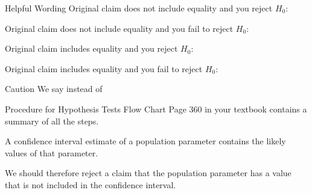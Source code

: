 \documentclass{beamer}
\begin{document}
\begin{frame}
\begin{block}{Helpful Wording}
Original claim does not include equality and you reject $H_0$:
\begin{center}\small
{}
\end{center}\pause

Original claim does not include equality and you fail to reject $H_0$:
\begin{center}\small
{}
\end{center}\pause

Original claim includes equality and you reject $H_0$:
\begin{center}\small
{}
\end{center}\pause

Original claim includes equality and you fail to reject $H_0$:
\begin{center}\small
{}
\end{center}
\end{block}\pause

\begin{block}{Caution}
We say  instead of 
\end{block}
\end{frame}

\begin{frame}
\begin{block}{Procedure for Hypothesis Tests Flow Chart}
Page 360 in your textbook contains a summary of all the steps.
\end{block}\pause

\begin{note}
A confidence interval estimate of a population parameter contains the likely values of that parameter. 

\vspace{2mm}
We should therefore reject a claim that the population parameter has a value that is not included in the confidence interval.
\end{note}
\end{frame}
\end{document}
